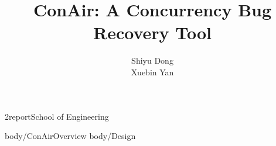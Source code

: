 \documentclass[12pt]{report}
\begin{document}

\department2report{School of Engineering}


\title{ConAir: A Concurrency Bug Recovery Tool}
\author{Shiyu Dong \\Xuebin Yan}







    \beforepreface

    \afterpreface



%



%



\graphicspath{{figures/}}

 {body/ConAirOverview}
 {body/Design}


 
%









%
\end{document}
